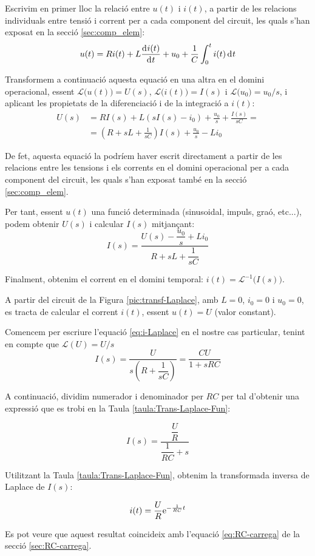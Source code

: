 Escrivim en primer lloc  la relació entre $u(t)$ i $i(t)$, a partir
de les relacions individuals entre tensió i corrent per a cada
component del circuit, les quals s'han exposat en la secció
\vref{sec:comp_elem}:
\begin{equation}
    u(t) = R i(t) + L \frac{\diff i(t)}{\diff t} + u_0 + \frac{1}{C}
    \int_0^t i(t) \diff t
\end{equation}

Transformem a continuació aquesta equació en una altra en el domini
operacional, essent $\mathcal{L}\bigl(u(t)\bigr) = U(s)$,
$\mathcal{L}\bigl(i(t)\bigr) = I(s)$ i $\mathcal{L}\bigl(u_0\bigr) =
u_0/s$, i aplicant les propietats de la diferenciació i de la
integració a $i(t)$:
\begin{equation}\begin{split}
    U(s) &= R I(s) + L(s I(s) -i_0) + \frac{u_0}{s} + \frac{I(s)}{s
    C} =\\[1ex]
    &= \left( R + s L +\frac{1}{s C}\right)I(s) + \frac{u_0}{s} - L i_0
\end{split}\end{equation}

De fet, aquesta equació la podríem haver escrit directament a
partir de les relacions entre les tensions i els corrents en el
domini operacional per a cada  component del circuit, les quals
s'han exposat també en la secció \vref{sec:comp_elem}.

Per tant, essent $u(t)$  una funció determinada (sinusoidal, impuls,
graó, etc...), podem obtenir $U(s)$ i calcular $I(s)$ mitjançant:
\begin{equation}
    I(s) = \frac{U(s)-\dfrac{u_0}{s} + L i_0}{R + s L
    +\dfrac{1}{s C}}\label{eq:i-Laplace}
\end{equation}

Finalment, obtenim el corrent en el domini temporal: $i(t) =
\mathcal{L}^{-1}\bigl(I(s)\bigr)$.

\begin{exemple}
    A partir del circuit de la Figura \vref{pic:transf-Laplace}, amb
    $L=0$, $i_0=0$ i $u_0=0$, es tracta de calcular el corrent $i(t)$,
    essent $u(t)=U$ (valor constant).

    Comencem per escriure l'equació \eqref{eq:i-Laplace} en el nostre
    cas particular, tenint en compte que $\mathcal{L}(U) = U/s$
    \[
        I(s) = \frac{U}{s\left(R + \dfrac{1}{s C}\right)} = \frac{C U}{1 + s R C}
    \]

    A continuació, dividim numerador i denominador per $R C$ per tal
    d'obtenir una expressió que es trobi en la Taula
    \vref{taula:Trans-Laplace-Fun}:

    \[
        I(s) = \frac{\dfrac{U}{R}}{\dfrac{1}{R C} + s}
    \]

    Utilitzant la Taula \vref{taula:Trans-Laplace-Fun}, obtenim la transformada inversa de Laplace de $I(s)$:

    \[
        i(t) = \frac{U}{R} \mathrm{e}^{-\frac{1}{R C}t}
    \]

    Es pot veure que aquest resultat coincideix amb l'equació \eqref{eq:RC-carrega} de la secció \vref{sec:RC-carrega}.
\end{exemple}

